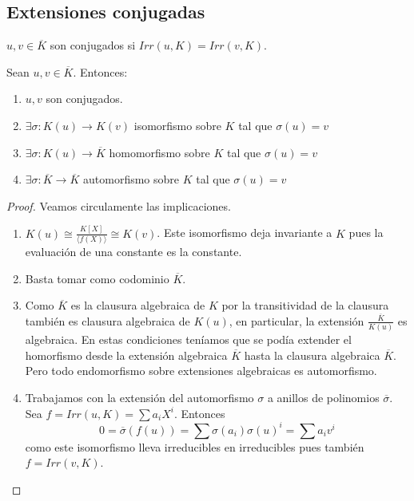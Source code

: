 \subsection{Extensiones conjugadas}

\begin{definition}
$u,v \in \overline{K}$ son conjugados si $Irr(u,K) = Irr(v,K)$. 
\end{definition}

\begin{proposition}
Sean $u,v \in \overline{K}$. Entonces:

\begin{enumerate}
\item $u,v$ son conjugados.
\item $\exists \sigma: K(u) \to K(v)$ isomorfismo sobre $K$ tal que $\sigma(u) = v$
\item $\exists \sigma:K(u) \to \overline{K}$ homomorfismo sobre $K$ tal que $\sigma(u) = v$
\item $\exists \sigma:\overline{K} \to \overline{K}$ automorfismo sobre $K$ tal que $\sigma(u)= v$
\end{enumerate}
\end{proposition}
\begin{proof}
Veamos circulamente las implicaciones.

\begin{enumerate}
\item $K(u) \cong \frac{K[X]}{\langle f(X) \rangle} \cong K(v)$. Este isomorfismo deja invariante a $K$ pues la evaluación de una constante es la constante. 
\item Basta tomar como codominio $\overline{K}$.
\item Como $\overline{K}$ es la clausura algebraica de $K$ por la transitividad de la clausura también es clausura algebraica de $K(u)$, en particular, la extensión $\frac{\overline{K}}{K(u)}$ es algebraica. En estas condiciones teníamos que se podía extender el homorfismo desde la extensión algebraica $\overline{K}$ hasta la clausura algebraica $\overline{K}$. Pero todo endomorfismo sobre extensiones algebraicas es automorfismo.
\item Trabajamos con la extensión del automorfismo $\sigma$ a anillos de polinomios $\overline{\sigma}$. Sea $f = Irr(u,K) = \sum a_iX^i$. Entonces $$0 = \overline{\sigma}(f(u)) = \sum \sigma(a_i)\sigma(u)^i = \sum a_i v^i$$ como este isomorfismo lleva irreducibles en irreducibles pues también $f = Irr(v,K)$. 
\end{enumerate}
\end{proof}

